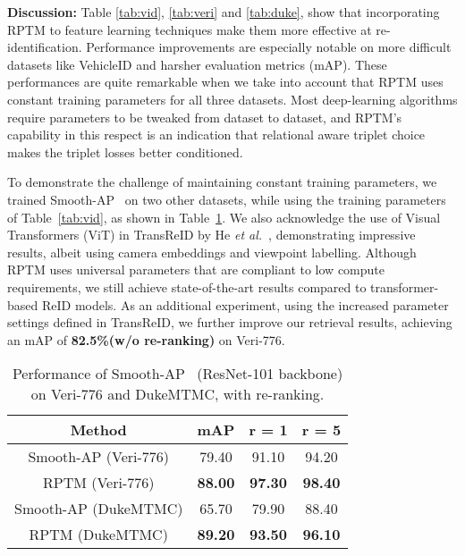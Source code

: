 \documentclass[10pt,twocolumn,letterpaper]{article}
\begin{document}
\textbf{Discussion:} 
Table \ref{tab:vid},  \ref{tab:veri} and \ref{tab:duke}, show that incorporating 
RPTM to feature learning techniques make them more   effective at re-identification. Performance improvements are especially
notable on more difficult datasets like VehicleID and harsher evaluation metrics (mAP). These performances are quite remarkable when we take into account that RPTM uses constant training parameters for all three datasets. Most deep-learning
algorithms require parameters to be tweaked from dataset to dataset, and RPTM's capability in this respect is an indication
that relational aware triplet choice makes the triplet losses better conditioned.

To demonstrate the challenge of maintaining constant training parameters, we trained Smooth-AP~\cite{brown2020smooth} 
 on  two other datasets, while using the training parameters of Table~\ref{tab:vid}, as shown in Table~\ref{tab:smoothap}. We also acknowledge the use of Visual Transformers (ViT) in TransReID by He \textit{et al.}~\cite{he2021transreid}, demonstrating impressive results, albeit using camera embeddings and viewpoint labelling. Although RPTM uses universal parameters that are compliant to low compute requirements, we still achieve state-of-the-art results compared to transformer-based ReID models. As an additional experiment, using the increased parameter settings defined in TransReID, we further improve our retrieval results, achieving an mAP of \textbf{82.5\%(w/o re-ranking)} on Veri-776.
 
 \begin{table}[h]

\begin{center}
\begin{tabular}{c|c|c|c  }
 Method & mAP &r = 1&r = 5\\
 \hline
 \hline
Smooth-AP (Veri-776) & 79.40& 91.10&94.20\\
RPTM (Veri-776) & \textbf{88.00} & \textbf{97.30}&\textbf{98.40}\\

 \hline
 Smooth-AP (DukeMTMC) & 65.70& 79.90&88.40\\
 RPTM (DukeMTMC) & \textbf{89.20} & \textbf{93.50} & \textbf{96.10}\\
 \hline
\end{tabular}
\end{center}
\caption{Performance of Smooth-AP~\cite{brown2020smooth} (ResNet-101 backbone) on Veri-776 and DukeMTMC, with re-ranking.}
\label{tab:smoothap}
\end{table}
\end{document}
